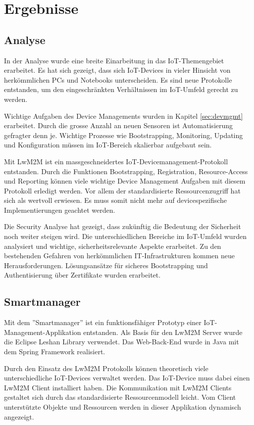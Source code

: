 \chapter{Ergebnisse}
\section{Analyse}
In der Analyse wurde eine breite Einarbeitung in das IoT-Themengebiet erarbeitet. Es hat sich gezeigt, dass sich IoT-Devices in vieler Hinsicht von herkömmlichen PCs und Notebooks unterscheiden. Es sind neue Protokolle entstanden, um den eingeschränkten Verhältnissen im IoT-Umfeld gerecht zu werden.

Wichtige Aufgaben des Device Managements wurden in Kapitel \ref{sec:devmgmt} erarbeitet. Durch die grosse Anzahl an neuen Sensoren ist Automatisierung gefragter denn je. Wichtige Prozesse wie Bootstrapping, Monitoring, Updating und Konfiguration müssen im IoT-Bereich skalierbar aufgebaut sein.

Mit LwM2M ist ein massgeschneidertes IoT-Devicemanagement-Protokoll entstanden. Durch die Funktionen Bootstrapping, Registration, Resource-Access und Reporting können viele wichtige Device Management Aufgaben mit diesem Protokoll erledigt werden. Vor allem der standardisierte Ressourcenzugriff hat sich als wertvoll erwiesen. Es muss somit nicht mehr auf devicespezifische Implementierungen geachtet werden.

Die Security Analyse hat gezeigt, dass zukünftig die Bedeutung der Sicherheit noch weiter steigen wird. Die unterschiedlichen Bereiche im IoT-Umfeld wurden analysiert und wichtige, sicherheitsrelevante Aspekte erarbeitet. Zu den bestehenden Gefahren von herkömmlichen IT-Infrastrukturen kommen neue Herausforderungen. Lösungsansätze für sicheres Bootstrapping und Authentisierung über Zertifikate wurden erarbeitet.    

\section{Smartmanager}
Mit dem ''Smartmanager'' ist ein funktionsfähiger Prototyp einer IoT-Management-Applikation entstanden. Als Basis für den LwM2M Server wurde die Eclipse Leshan Library verwendet. Das Web-Back-End wurde in Java mit dem Spring Framework realisiert. 

Durch den Einsatz des LwM2M Protokolls können theoretisch viele unterschiedliche IoT-Devices verwaltet werden. Das IoT-Device muss dabei einen LwM2M Client installiert haben. Die Kommunikation mit LwM2M Clients gestaltet sich durch das standardisierte Ressourcenmodell leicht. Vom Client unterstützte Objekte und Ressourcen werden in dieser Applikation dynamisch angezeigt.

